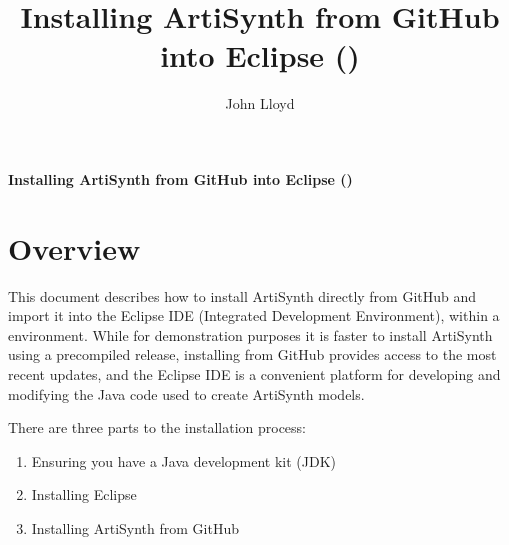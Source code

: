 \usepackage{enumitem}

\iflatexml
\else
\fancyhead[L,C,R]{}
\fancyfoot[L,R]{}
\fancyfoot[C]{\thepage}
\renewcommand{\headrulewidth}{0pt}
\renewcommand{\footrulewidth}{0pt}
\fi

\def\ArtHome[#1]{{\tt <ARTISYNTH\_HOME>#1}}

\title{Installing ArtiSynth from GitHub into Eclipse (\SYSTEM{})}
\author{John Lloyd}
\iflatexml
\date{}
\fi

\newif\ifNeedLibraryPath
\NeedLibraryPathfalse




\iflatexml{\large\pubdate}\fi


\iflatexml\else
\begin{center}
{\sffamily\Large\bfseries 
Installing ArtiSynth from GitHub into Eclipse (\SYSTEM{})}
\end{center}
\bigskip
\fi

\section{Overview}

This document describes how to install ArtiSynth directly from GitHub
and import it into the Eclipse IDE (Integrated Development
Environment), within a \SYSTEM{} environment. While for demonstration
purposes it is faster to install ArtiSynth using a precompiled
release, installing from GitHub provides access to the most recent
updates, and the Eclipse IDE is a convenient platform for developing
and modifying the Java code used to create ArtiSynth models.

There are three parts to the installation process:

\begin{enumerate}

\item Ensuring you have a Java development kit (JDK)

\item Installing Eclipse

\item Installing ArtiSynth from GitHub

\end{enumerate}

